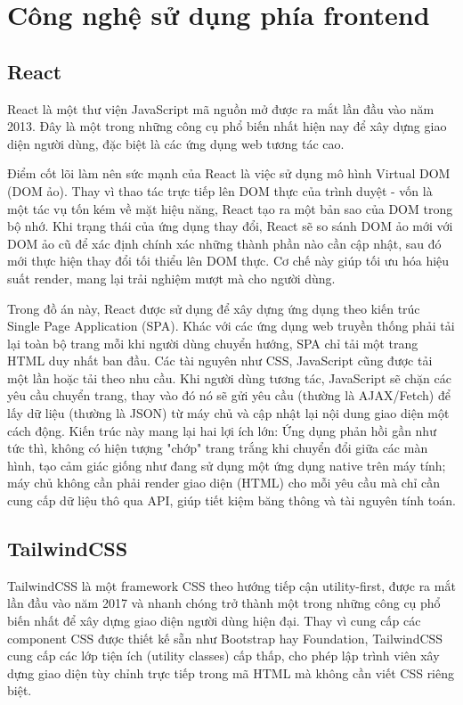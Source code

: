 \documentclass[../20232006p.tex]{subfiles}
\begin{document}
\section{Công nghệ sử dụng phía frontend}
\subsection{React}
React \cite{react} là một thư viện JavaScript mã nguồn mở được ra mắt lần đầu vào năm 2013. Đây là một trong những công cụ phổ biến nhất hiện nay để xây dựng giao diện người dùng, đặc biệt là các ứng dụng web tương tác cao.

Điểm cốt lõi làm nên sức mạnh của React là việc sử dụng mô hình Virtual DOM (DOM ảo). Thay vì thao tác trực tiếp lên DOM thực của trình duyệt - vốn là một tác vụ tốn kém về mặt hiệu năng, React tạo ra một bản sao của DOM trong bộ nhớ. Khi trạng thái của ứng dụng thay đổi, React sẽ so sánh DOM ảo mới với DOM ảo cũ  để xác định chính xác những thành phần nào cần cập nhật, sau đó mới thực hiện thay đổi tối thiểu lên DOM thực. Cơ chế này giúp tối ưu hóa hiệu suất render, mang lại trải nghiệm mượt mà cho người dùng.

Trong đồ án này, React được sử dụng để xây dựng ứng dụng theo kiến trúc Single Page Application (SPA). Khác với các ứng dụng web truyền thống phải tải lại toàn bộ trang mỗi khi người dùng chuyển hướng, SPA chỉ tải một trang HTML duy nhất ban đầu. Các tài nguyên như CSS, JavaScript cũng được tải một lần hoặc tải theo nhu cầu. Khi người dùng tương tác, JavaScript sẽ chặn các yêu cầu chuyển trang, thay vào đó nó sẽ gửi yêu cầu (thường là AJAX/Fetch) để lấy dữ liệu (thường là JSON) từ máy chủ và cập nhật lại nội dung giao diện một cách động. Kiến trúc này mang lại hai lợi ích lớn:  Ứng dụng phản hồi gần như tức thì, không có hiện tượng "chớp" trang trắng khi chuyển đổi giữa các màn hình, tạo cảm giác giống như đang sử dụng một ứng dụng native trên máy tính; máy chủ không cần phải render giao diện (HTML) cho mỗi yêu cầu mà chỉ cần cung cấp dữ liệu thô qua API, giúp tiết kiệm băng thông và tài nguyên tính toán.

\subsection{TailwindCSS}

TailwindCSS \cite{tailwindcss} là một framework CSS theo hướng tiếp cận utility-first, được ra mắt lần đầu vào năm 2017 và nhanh chóng trở thành một trong những công cụ phổ biến nhất để xây dựng giao diện người dùng hiện đại. Thay vì cung cấp các component CSS được thiết kế sẵn như Bootstrap hay Foundation, TailwindCSS cung cấp các lớp tiện ích (utility classes) cấp thấp, cho phép lập trình viên xây dựng giao diện tùy chỉnh trực tiếp trong mã HTML mà không cần viết CSS riêng biệt.
\end{document}
